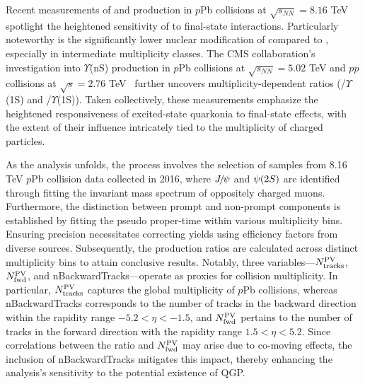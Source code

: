 Recent measurements of \jpsi and \psitwos production in $p$Pb collisions at $\sqrt{s_{NN}}=8.16$ TeV~\cite{ALICE:2020tsj} spotlight the heightened sensitivity of \psitwos to final-state interactions. Particularly noteworthy is the significantly lower nuclear modification of \psitwos compared to \jpsi, especially in intermediate multiplicity classes. The CMS collaboration's investigation into $\Upsilon$(nS) production in $p$Pb collisions at $\sqrt{s_{NN}}=5.02$ TeV and $pp$ collisions at $\sqrt{s}=2.76$ TeV~\cite{CMS:2013jsu} further uncovers multiplicity-dependent ratios (\TwoS/$\Upsilon$(1S) and \ThreeS/$\Upsilon$(1S)). Taken collectively, these measurements emphasize the heightened responsiveness of excited-state quarkonia to final-state effects, with the extent of their influence intricately tied to the multiplicity of charged particles.


As the analysis unfolds, the process involves the selection of samples from 8.16 TeV $p$Pb collision data collected in 2016, where ${{J\mskip -3mu/\mskip -2mu\psi}}$ and ${\psi{(2S)}}$ are identified through fitting the invariant mass spectrum of oppositely charged muons. Furthermore, the distinction between prompt and non-prompt components is established by fitting the pseudo proper-time within various multiplicity bins. Ensuring precision necessitates correcting yields using efficiency factors from diverse sources. Subsequently, the production ratios are calculated across distinct multiplicity bins to attain conclusive results. Notably, three variables—$N^{\rm PV}_{\rm tracks}$, $N^{\rm PV}_{\rm fwd}$, and nBackwardTracks—operate as proxies for collision multiplicity. In particular, $N^{\rm PV}_{\rm tracks}$ captures the global multiplicity of $p$Pb collisions, whereas nBackwardTracks corresponds to the number of tracks in the backward direction within the rapidity range $-5.2 < \eta < -1.5$, and $N^{\rm PV}_{\rm fwd}$ pertains to the number of tracks in the forward direction with the rapidity range $1.5 < \eta < 5.2$. Since correlations between the ratio and $N^{\rm PV}_{\rm fwd}$ may arise due to co-moving effects, the inclusion of nBackwardTracks mitigates this impact, thereby enhancing the analysis's sensitivity to the potential existence of QGP.

